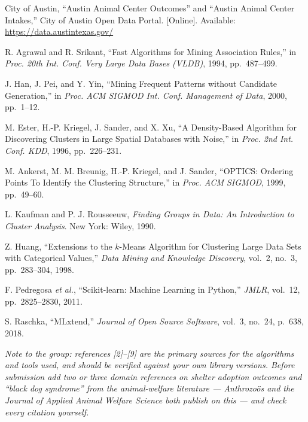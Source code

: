 \documentclass[11pt,a4paper]{article}
\begin{document}
\begin{enumerate}[label={[\arabic*]}]
  \item City of Austin, ``Austin Animal Center Outcomes'' and ``Austin Animal
        Center Intakes,'' City of Austin Open Data Portal. [Online]. Available:
        \url{https://data.austintexas.gov/}
  \item R. Agrawal and R. Srikant, ``Fast Algorithms for Mining Association
        Rules,'' in \emph{Proc. 20th Int. Conf. Very Large Data Bases (VLDB)},
        1994, pp.~487--499.
  \item J. Han, J. Pei, and Y. Yin, ``Mining Frequent Patterns without Candidate
        Generation,'' in \emph{Proc. ACM SIGMOD Int. Conf. Management of Data},
        2000, pp.~1--12.
  \item M. Ester, H.-P. Kriegel, J. Sander, and X. Xu, ``A Density-Based
        Algorithm for Discovering Clusters in Large Spatial Databases with
        Noise,'' in \emph{Proc. 2nd Int. Conf. KDD}, 1996, pp.~226--231.
  \item M. Ankerst, M. M. Breunig, H.-P. Kriegel, and J. Sander, ``OPTICS:
        Ordering Points To Identify the Clustering Structure,'' in \emph{Proc.
        ACM SIGMOD}, 1999, pp.~49--60.
  \item L. Kaufman and P. J. Rousseeuw, \emph{Finding Groups in Data: An
        Introduction to Cluster Analysis}. New York: Wiley, 1990.
  \item Z. Huang, ``Extensions to the $k$-Means Algorithm for Clustering Large
        Data Sets with Categorical Values,'' \emph{Data Mining and Knowledge
        Discovery}, vol.~2, no.~3, pp.~283--304, 1998.
  \item F. Pedregosa \emph{et al.}, ``Scikit-learn: Machine Learning in
        Python,'' \emph{JMLR}, vol.~12, pp.~2825--2830, 2011.
  \item S. Raschka, ``MLxtend,'' \emph{Journal of Open Source Software},
        vol.~3, no.~24, p.~638, 2018.
\end{enumerate}

\vspace{6pt}
\noindent\footnotesize\emph{Note to the group: references [2]--[9] are the
primary sources for the algorithms and tools used, and should be verified
against your own library versions. Before submission add two or three domain
references on shelter adoption outcomes and ``black dog syndrome'' from the
animal-welfare literature --- \emph{Anthrozo\"os} and the \emph{Journal of
Applied Animal Welfare Science} both publish on this --- and check every
citation yourself.}
\end{document}
